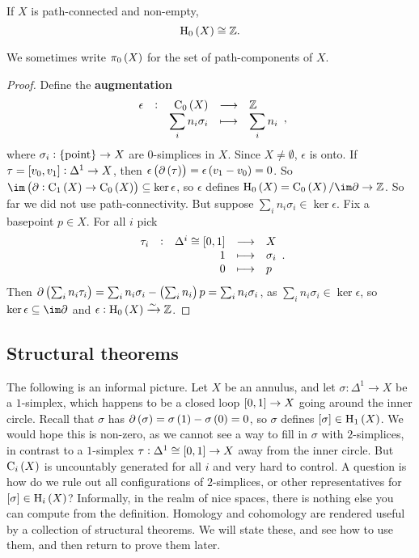 \begin{lemma}
If $ X $ is path-connected and non-empty,
$$ \H_0\br{X} \cong \ZZ. $$
\end{lemma}

We sometimes write $ \pi_0\br{X} $ for the set of path-components of $ X $.

\begin{proof}
Define the \textbf{augmentation}
$$ \function[\epsilon]{\C_0\br{X}}{\ZZ}{\displaystyle\sum_i n_i\sigma_i}{\displaystyle\sum_i n_i}, $$
where $ \sigma_i : \pt \to X $ are $ 0 $-simplices in $ X $. Since $ X \ne \emptyset $, $ \epsilon $ is onto. If $ \tau = \sbr{v_0, v_1} : \Delta^1 \to X $, then $ \epsilon\br{\da\br{\tau}} = \epsilon\br{v_1 - v_0} = 0 $. So $ \im \br{\da : \C_1\br{X} \to \C_0\br{X}} \subseteq \ker \epsilon $, so $ \epsilon $ defines $ \H_0\br{X} = \C_0\br{X} / \im \da \to \ZZ $. So far we did not use path-connectivity. But suppose $ \sum_i n_i\sigma_i \in \ker \epsilon $. Fix a basepoint $ p \in X $. For all $ i $ pick
$$ \functions[\tau_i]{\Delta^i \cong \sbr{0, 1}}{X}{1}{\sigma_i}{0}{p}. $$
Then $ \da\br{\sum_i n_i\tau_i} = \sum_i n_i\sigma_i - \br{\sum_i n_i}p = \sum_i n_i\sigma_i $, as $ \sum_i n_i\sigma_i \in \ker \epsilon $, so $ \ker \epsilon \subseteq \im \da $ and $ \epsilon : \H_0\br{X} \xrightarrow{\sim} \ZZ $.
\end{proof}

\pagebreak

\subsection{Structural theorems}

The following is an informal picture. Let $ X $ be an annulus, and let $ \sigma : \Delta^1 \to X $ be a $ 1 $-simplex, which happens to be a closed loop $ \sbr{0, 1} \to X $ going around the inner circle. Recall that $ \sigma $ has $ \da\br{\sigma} = \sigma\br{1} - \sigma\br{0} = 0 $, so $ \sigma $ defines $ \sbr{\sigma} \in \H_1\br{X} $. We would hope this is non-zero, as we cannot see a way to fill in $ \sigma $ with $ 2 $-simplices, in contrast to a $ 1 $-simplex $ \tau : \Delta^1 \cong \sbr{0, 1} \to X $ away from the inner circle. But $ \C_i\br{X} $ is uncountably generated for all $ i $ and very hard to control. A question is how do we rule out all configurations of $ 2 $-simplices, or other representatives for $ \sbr{\sigma} \in \H_i\br{X} $? Informally, in the realm of nice spaces, there is nothing else you can compute from the definition. Homology and cohomology are rendered useful by a collection of structural theorems. We will state these, and see how to use them, and then return to prove them later.

